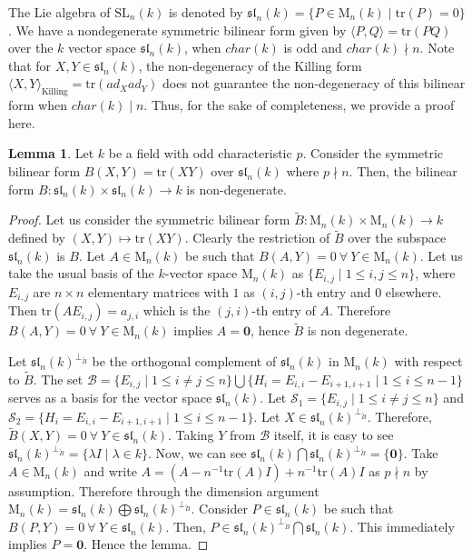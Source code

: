 \documentclass[10pt,twoside]{amsart}
\newcommand{\SL}{\mathrm{SL}}
\newcommand{\tr}{\mathrm{tr}}
\newcommand{\M}{\mathrm{M}}
\theoremstyle{definition}
\theoremstyle{definition}
\newtheorem{lemma}[theorem]{Lemma}
\begin{document}
The Lie algebra of $\SL_n(k)$ is denoted by $\mathfrak{sl}_n(k) = \{P \in \M_n(k) \mid \tr(P) = 0\}$. We have a nondegenerate symmetric bilinear form given by $\langle P, Q \rangle = \tr(PQ)$ over the $k$ vector space $\mathfrak{sl}_n(k)$, when $char(k)$ is odd and $char(k) \nmid n$. Note that for $X, Y \in \mathfrak{sl}_n(k)$, the non-degeneracy of the Killing form $\langle X, Y\rangle_{\text{Killing}} = \tr(ad_X  ad_Y)$ does not guarantee the non-degeneracy of this bilinear form when $char(k)\mid n$.
\iffalse
Thus, for the sake of completeness, we provide a proof here.
\begin{lemma}{\label{non degeneracy}}
Let $k$ be a field with odd characteristic $p$. Consider the symmetric bilinear form $B(X, Y) = \tr(XY)$ over $\mathfrak{sl}_n(k)$ where $p\nmid n$. Then, the bilinear form  $B\colon \mathfrak{sl}_n(k) \times \mathfrak{sl}_n(k) \rightarrow k $ is non-degenerate.
\end{lemma}
\begin{proof}
Let us consider the symmetric bilinear form $\widetilde{B} \colon \M_n(k)\times \M_n(k)\rightarrow k$ defined by $(X,Y)\mapsto \tr(XY)$. Clearly the restriction of $\widetilde{B}$ over the subspace $\mathfrak{sl}_n(k)$ is $B$. Let $A\in \M_n(k)$ be such that $B(A, Y) = 0\ \forall\  Y\in \M_n(k)$. Let us take the usual basis of the $k$-vector space $\M_n(k)$ as $\{E_{i,j} \mid 1 \leq i, j\leq n\}$, where $E_{i,j}$ are $n\times n$ elementary matrices with $1$ as $(i,j)$-th entry and $0$ elsewhere. Then $\tr(AE_{i,j}) = a_{j,i}$ which is the $(j,i)$-th entry of $A$. Therefore $B(A, Y) = 0\ \forall\  Y\in \M_n(k)$ implies $A= \mathbf{0}$, hence $\widetilde{B}$ is non degenerate. 

Let $\mathfrak{sl}_n(k)^{\perp_{\widetilde{B}}}$ be the orthogonal complement of $\mathfrak{sl}_n(k)$ in $\M_n(k)$ with respect to $\widetilde{B}$. The set $\mathcal{B}=\{E_{i,j} \mid 1\leq i \neq j\leq n\} \bigcup \{H_i = E_{i,i}-E_{i+1,i+1} \mid  1\leq i\leq n-1\}$ serves as a basis for the vector space $\mathfrak{sl}_n(k)$. Let $\mathcal{S}_1= \{ E_{i, j} \mid 1\leq i\neq j \leq n\}$ and $\mathcal{S}_2=\{H_i = E_{i,i}-E_{i+1,i+1} \mid 1\leq i\leq n-1\}$. Let $X\in \mathfrak{sl}_n(k)^{\perp_{\widetilde{B}}} $. Therefore, $\widetilde{B}(X, Y) = 0\ \forall\ Y\in \mathfrak{sl}_n(k)$. Taking $Y$ from $\mathcal{B}$ itself, it is easy to see $\mathfrak{sl}_n(k)^{\perp_{\widetilde{B}}} = \{\lambda I \mid \lambda \in k\}$. Now, we can see $\mathfrak{sl}_n(k) \bigcap \mathfrak{sl}_n(k)^{\perp_{\widetilde{B}}} = \{\mathbf{0\}}$. Take $A\in \M_n(k)$ and write $A = (A-n^{-1} \tr(A) I) + n^{-1} \tr(A)I$ as $p\nmid n$ by assumption. Therefore through the dimension argument $\M_n(k)=\mathfrak{sl}_n(k)\bigoplus \mathfrak{sl}_n(k)^{\perp_{\widetilde{B}}}$. Consider $P\in \mathfrak{sl}_n(k)$ be such that $B(P, Y) = 0\ \forall \ Y\in \mathfrak{sl}_n(k)$. Then, $P\in \mathfrak{sl}_n(k)^{\perp_{\widetilde{B}}} \bigcap\mathfrak{sl}_n(k)$. This immediately implies $P = \mathbf{0}$. Hence the lemma.
\end{proof}
\end{document}
